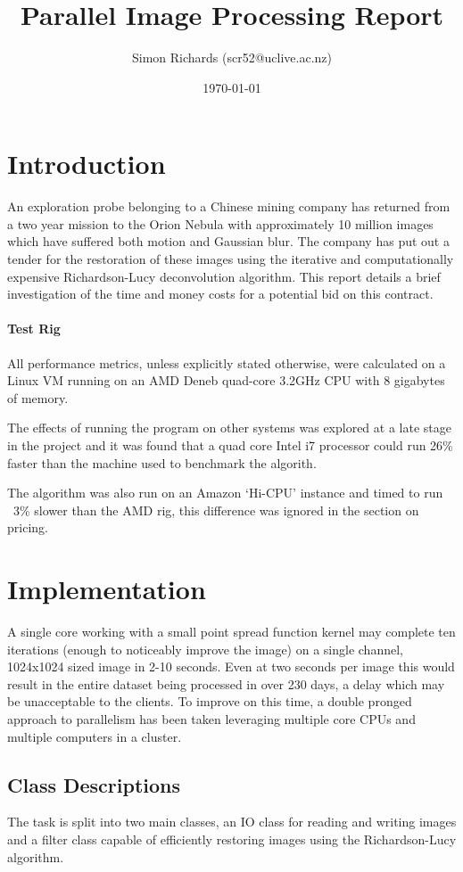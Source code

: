 \documentclass{article}
\title{Parallel Image Processing Report}
\date{\today}
\author{Simon Richards (scr52@uclive.ac.nz)}
\begin{document}
\maketitle
\section{Introduction}
An exploration probe belonging to a Chinese mining company has returned from a
two year mission to the Orion Nebula with  approximately 10 million images which
have suffered both motion and Gaussian blur. The company has put out a tender
for the restoration of these images using the iterative and computationally
expensive Richardson-Lucy deconvolution algorithm. This report details a brief
investigation of the time and money costs for a potential bid on this contract.

\paragraph{Test Rig}
All performance metrics, unless explicitly stated otherwise, were calculated on
a Linux VM running on an AMD Deneb quad-core 3.2GHz CPU with 8 gigabytes of
memory.

The effects of running the program on other systems was explored at a late
stage in the project and it was found that a quad core Intel i7 processor could run 26\%
faster than the machine used to benchmark the algorith.

The algorithm was also run on an Amazon `Hi-CPU' instance and timed to run ~3\%
slower than the AMD rig, this difference was ignored in the section on pricing.

\section{Implementation}
A single core working with a small point spread function kernel may complete ten
iterations (enough to noticeably improve the image) on a single channel,
1024x1024 sized image in 2-10 seconds. Even at two seconds per image this would
result in the entire dataset being processed in over 230 days, a delay which may
be unacceptable to the clients. To improve on this time, a double pronged
approach to parallelism has been taken leveraging multiple core CPUs and
multiple computers in a cluster.

\subsection{Class Descriptions}
The task is split into two main classes, an IO class for reading and writing
images and a filter class capable of efficiently restoring images using the
Richardson-Lucy algorithm.
\end{document}
